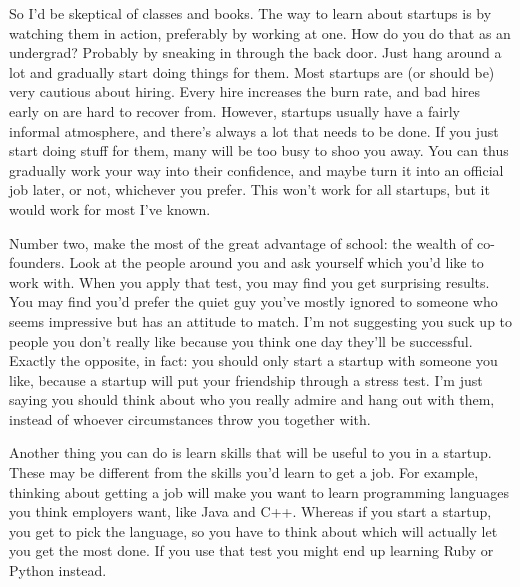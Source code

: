 So I'd be skeptical of classes and books. The
                  way to learn about startups is by watching them in action,
                  preferably by working at one. How do you do that as an
                  undergrad? Probably by sneaking in through the back door. Just
                  hang around a lot and gradually start doing things for them.
                  Most startups are (or should be) very cautious about hiring.
                  Every hire increases the burn rate, and bad hires early on are
                  hard to recover from. However, startups usually have a fairly
                  informal atmosphere, and there's always a lot that needs to be
                  done. If you just start doing stuff for them, many will be too
                  busy to shoo you away. You can thus gradually work your way
                  into their confidence, and maybe turn it into an official job
                  later, or not, whichever you prefer. This won't work for all
                  startups, but it would work for most I've known.

Number
                  two, make the most of the great advantage of school: the
                  wealth of co-founders. Look at the people around you and ask
                  yourself which you'd like to work with. When you apply that
                  test, you may find you get surprising results. You may find
                  you'd prefer the quiet guy you've mostly ignored to someone
                  who seems impressive but has an attitude to match. I'm not
                  suggesting you suck up to people you don't really like because
                  you think one day they'll be successful. Exactly the opposite,
                  in fact: you should only start a startup with someone you
                  like, because a startup will put your friendship through a
                  stress test. I'm just saying you should think about who you
                  really admire and hang out with them, instead of whoever
                  circumstances throw you together with.

Another
                  thing you can do is learn skills that will be useful to you in
                  a startup. These may be different from the skills you'd learn
                  to get a job. For example, thinking about getting a job will
                  make you want to learn programming languages you think
                  employers want, like Java and C++. Whereas if you start a
                  startup, you get to pick the language, so you have to think
                  about which will actually let you get the most done. If you
                  use that test you might end up learning Ruby or Python
                  instead.


